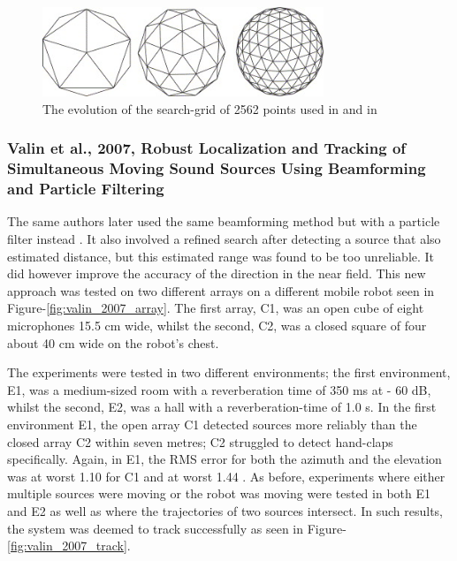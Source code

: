 \documentclass[notitlepage]{report}
\begin{document}
\begin{figure}[H]
\includegraphics[width=0.75\textwidth]{./valin_2007/grid.jpg}
\centering
\caption{The evolution of the search-grid of 2562 points used in \cite{valin_robust_2003} and in \cite{valin_robust_2007}}
\label{fig:valin_2007_grid}
\centering
\end{figure}

\subsubsection{Valin et al., 2007, Robust Localization and Tracking of Simultaneous Moving Sound Sources Using Beamforming and Particle Filtering}

The same authors later used the same beamforming method but with a particle filter instead \cite{valin_robust_2007}. It also involved a refined search after detecting a source that also estimated distance, but this estimated range was found to be too unreliable. It did however improve the accuracy of the direction in the near field. This new approach was tested on two different arrays on a different mobile robot seen in Figure-\ref{fig:valin_2007_array}. The first array, C1, was an open cube of eight microphones 15.5 \si{cm} wide, whilst the second, C2, was a closed square of four about 40 \si{cm} wide on the robot's chest. 

The experiments were tested in two different environments; the first environment, E1, was a medium-sized room with a reverberation time of 350 \si{ms} at - 60 \si{dB}, whilst the second, E2, was a hall with a reverberation-time of 1.0 \si{s}. In the first environment E1, the open array C1 detected sources more reliably than the closed array C2 within seven metres; C2 struggled to detect hand-claps specifically. Again, in E1, the RMS error for both the azimuth and the elevation was at worst 1.10 \si{\deg} for C1 and at worst 1.44 \si{\deg}. As before, experiments where either multiple sources were moving or the robot was moving were tested in both E1 and E2 as well as where the trajectories of two sources intersect. In such results, the system was deemed to track successfully as seen in Figure-\ref{fig:valin_2007_track}. 
\end{document}
